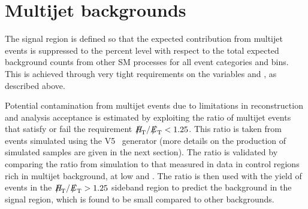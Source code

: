 \section{Multijet backgrounds}
\label{sec:qcd_background}

The signal region is defined so that the expected contribution from
multijet events is suppressed to the percent level with respect to
the total expected background counts from other SM processes for all
event categories and \scalht bins. This is achieved through very tight
requirements on the variables \alphat and \dphi, as described
above. 

Potential contamination from multijet events due to 
limitations in reconstruction and analysis acceptance is estimated 
by exploiting the ratio of multijet events that satisfy or fail the 
requirement $\mhtmet < 1.25$. This ratio is taken from events simulated 
using the \MADGRAPH V5~\cite{madgraph} generator 
(more details on the production of simulated samples are given in the next section).
The ratio is validated by comparing the ratio from simulation to that measured in data in control regions 
rich in multijet background, at low \alphat and \dphi.
The ratio is then used with the yield of events in the $\mhtmet > 1.25$ sideband region 
to predict the background in the signal region, which is found to be small compared to other backgrounds.

